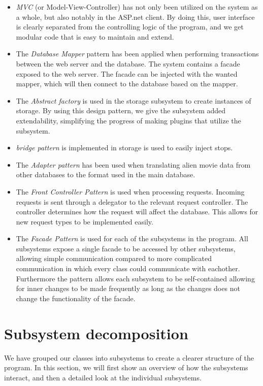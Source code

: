 \begin{itemize}
	\item \emph{MVC} (or Model-View-Controller) has not only been utilized on the system as a whole, but also notably in the ASP.net client. By doing this, user interface is clearly separated from the controlling logic of the program, and we get modular code that is easy to maintain and extend.
	\item The \emph{Database Mapper} pattern has been applied when performing transactions between the web server and the database. The system contains a facade exposed to the web server. The facade can be injected with the wanted mapper, which will then connect to the database based on the mapper.
	\item The \emph{Abstract factory} is used in the storage subsystem to create instances of storage. By using this design pattern, we give the subsystem added extendability, simplifying the progress of making plugins that utilize the subsystem.
	\item \emph{bridge pattern} is implemented  in storage is used to easily inject stops.
	\item The \emph{Adapter pattern} has been used when translating alien movie data from other databases to the format used in the main database.
	\item The \emph{Front Controller Pattern} is used when processing requests. Incoming requests is sent through a delegator to the relevant request controller. The controller determines how the request will affect the database. This allows for new request types to be implemented easily.
	\item The \emph{Facade Pattern} is used for each of the subsystems in the program. All subsystems expose a single facade to be accessed by other subsystems, allowing simple communication compared to more complicated communication in which every class could communicate with eachother. Furthermore the pattern allows each subsystem to be self-contained allowing for inner changes to be made frequently as long as the changes does not change the functionality of the facade.
\end{itemize}

\section{Subsystem decomposition}
\label{sec:Subsystem decomposition}
We have grouped our classes into subsystems to create a clearer structure of the program. In this section, we will first show an overview of how the subsystems interact, and then a detailed look at the individual subsystems.\\



